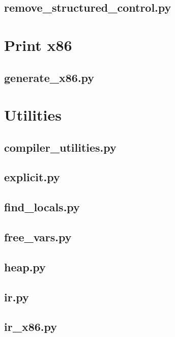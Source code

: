 \documentclass[letter,10pt]{article}
\begin{document}
\subsection{remove\_structured\_control.py}


\clearpage
\section{Print x86}

\subsection{generate\_x86.py}


\clearpage
\section*{Utilities}

\subsection{compiler\_utilities.py}


\subsection{explicit.py}


\subsection{find\_locals.py}


\subsection{free\_vars.py}


\subsection{heap.py}


\subsection{ir.py}


\subsection{ir\_x86.py}

\end{document}
